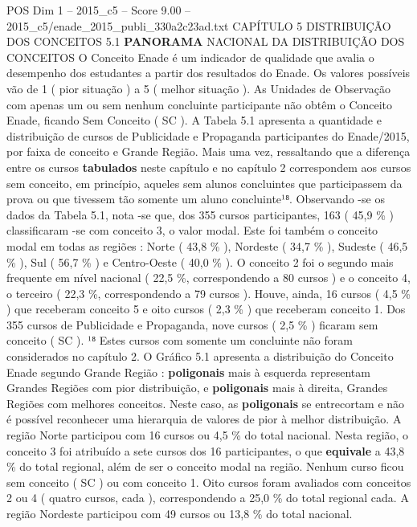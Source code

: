\begin{textsample}{POS Dim 1 – 2015\_c5 – Score 9.00 – 2015\_c5/enade\_2015\_publi\_330a2c23ad.txt}  \label{ex:f1_pos_099}
CAPÍTULO 5 DISTRIBUIÇÃO DOS CONCEITOS 5.1 \textbf{PANORAMA} NACIONAL DA DISTRIBUIÇÃO DOS CONCEITOS O Conceito Enade é um indicador de qualidade que avalia o desempenho dos estudantes a partir dos resultados do Enade.
Os valores possíveis vão de 1 ( pior situação ) a 5 ( melhor situação ).
As Unidades de Observação com apenas um ou sem nenhum concluinte participante não obtêm o Conceito Enade, ficando Sem Conceito ( SC ).
A Tabela 5.1 apresenta a quantidade e distribuição de cursos de Publicidade e Propaganda participantes do Enade/2015, por faixa de conceito e Grande Região.
Mais uma vez, ressaltando que a diferença entre os cursos \textbf{tabulados} neste capítulo e no capítulo 2 correspondem aos cursos sem conceito, em princípio, aqueles sem alunos concluintes que participassem da prova ou que tivessem tão somente um aluno concluinte¹⁸.
Observando -se os dados da Tabela 5.1, nota -se que, dos 355 cursos participantes, 163 ( 45,9 \% ) classificaram -se com conceito 3, o valor modal.
Este foi também o conceito modal em todas as regiões : Norte ( 43,8 \% ), Nordeste ( 34,7 \% ), Sudeste ( 46,5 \% ), Sul ( 56,7 \% ) e Centro-Oeste ( 40,0 \% ).
O conceito 2 foi o segundo mais frequente em nível nacional ( 22,5 \%, correspondendo a 80 cursos ) e o conceito 4, o terceiro ( 22,3 \%, correspondendo a 79 cursos ).
Houve, ainda, 16 cursos ( 4,5 \% ) que receberam conceito 5 e oito cursos ( 2,3 \% ) que receberam conceito 1.
Dos 355 cursos de Publicidade e Propaganda, nove cursos ( 2,5 \% ) ficaram sem conceito ( SC ). ¹⁸ Estes cursos com somente um concluinte não foram considerados no capítulo 2.
O Gráfico 5.1 apresenta a distribuição do Conceito Enade segundo Grande Região : \textbf{poligonais} mais à esquerda representam Grandes Regiões com pior distribuição, e \textbf{poligonais} mais à direita, Grandes Regiões com melhores conceitos.
Neste caso, as \textbf{poligonais} se entrecortam e não é possível reconhecer uma hierarquia de valores de pior à melhor distribuição.
A região Norte participou com 16 cursos ou 4,5 \% do total nacional.
Nesta região, o conceito 3 foi atribuído a sete cursos dos 16 participantes, o que \textbf{equivale} a 43,8 \% do total regional, além de ser o conceito modal na região.
Nenhum curso ficou sem conceito ( SC ) ou com conceito 1.
Oito cursos foram avaliados com conceitos 2 ou 4 ( quatro cursos, cada ), correspondendo a 25,0 \% do total regional cada.
A região Nordeste participou com 49 cursos ou 13,8 \% do total nacional.

\end{textsample}
